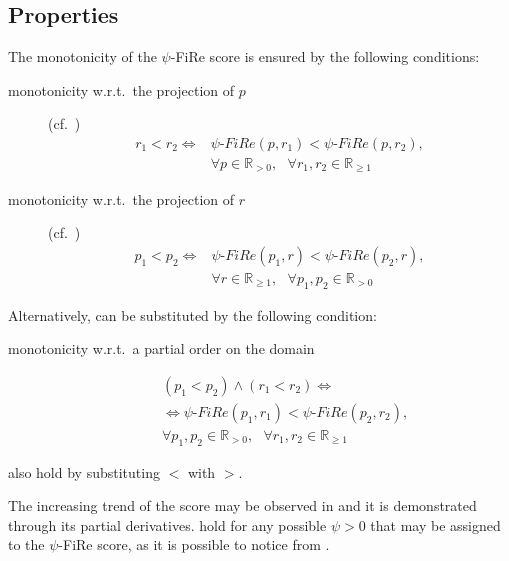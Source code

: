 \documentclass{article}
\newcommand{\fire}{FiRe}
\newcommand{\psifire}{$\psi$-\fire}
\begin{document}
\subsection{Properties}\label{sec:fire-prop}
The monotonicity of the \psifire{} score is ensured by the following conditions:
\begin{description}
	\item[monotonicity w.r.t.\ the projection of $p$] (cf.\ )
	\begin{equation}
		\begin{split}
			r_1 < r_2 \iff &\psi\textrm{-}\fire(p, r_1) < \psi\textrm{-}\fire(p, r_2), \\ &\forall p \in \mathbb{R}_{>0}, ~~~\forall r_1, r_2 \in \mathbb{R}_{\geq1}
		\end{split}\label{eq:projP}
	\end{equation}
	\item[monotonicity w.r.t.\ the projection of $r$] (cf.\ )
	\begin{equation}
		\begin{split}
			p_1 < p_2 \iff &\psi\textrm{-}\fire(p_1, r) < \psi\textrm{-}\fire(p_2, r), \\ &\forall r \in \mathbb{R}_{\geq1}, ~~~\forall p_1, p_2 \in \mathbb{R}_{>0}
		\end{split}\label{eq:projR}
	\end{equation}
\end{description}
%
Alternatively,  can be substituted by the following condition:
%
\begin{description}
	\item[monotonicity w.r.t.\ a partial order on the domain] 
	\begin{equation}
		\begin{split}
			&(p_1 < p_2) \wedge (r_1 < r_2) \iff \\&\iff \psi\textrm{-}\fire(p_1, r_1) < \psi\textrm{-}\fire(p_2, r_2), \\ &\forall p_1, p_2 \in \mathbb{R}_{>0}, ~~~\forall r_1, r_2 \in \mathbb{R}_{\geq1}
		\end{split}\label{eq:partial}
	\end{equation}
\end{description}
%
 also hold by substituting $<$ with $>$.

The increasing trend of the score may be observed in  and it is demonstrated through its partial derivatives.
%
 hold for any possible $\psi>0$ that may be assigned to the \psifire{} score, as it is possible to notice from .
\end{document}
